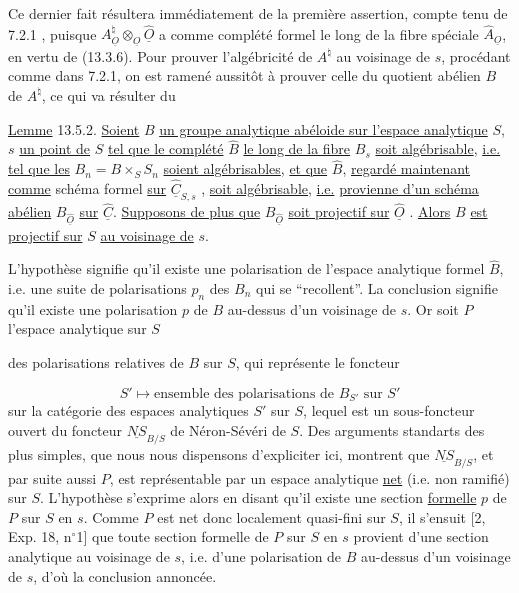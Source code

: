 Ce dernier fait résultera immédiatement de la première assertion, compte tenu de 7.2.1 , puisque $A^\natural_{\underline{O}} \otimes_{\underline{O}} \hat{\underline{O}}$ a comme complété formel le long de la fibre spéciale $\hat{A}_{\underline{O}}$, en vertu de (13.3.6). Pour prouver l'algébricité de $A^\natural$ au voisinage de $s$, procédant comme dans 7.2.1, on est ramené aussitôt à prouver celle du quotient abélien $B$ de $A^\natural$, ce qui va résulter du

\underline{Lemme} 13.5.2. \underline{Soient} $B$ \underline{un groupe analytique abéloide sur l'espace analytique} $S$, $s$ \underline{un point de} $S$ \underline{tel que le complété} $\hat{B}$ \underline{le long de la fibre} $B_s$ \underline{soit algébrisable}, \underline{i.e.} \underline{tel que les} $B_n = B \times_S S_n$ \underline{soient algébrisables}, \underline{et que} $\hat{B}$, \underline{regardé maintenant comme} schéma formel \underline{sur} $\hat{\underline{C}}_{S,s}$ , \underline{soit algébrisable}, \underline{i.e.} \underline{provienne d'un schéma abélien} $B_{\hat{\underline{O}}}$ \underline{sur} $\hat{\underline{C}}$. \underline{Supposons de plus que} $B_{\hat{\underline{O}}}$ \underline{soit projectif sur} $\hat{\underline{O}}$ . \underline{Alors} $B$ \underline{est projectif sur} $S$ \underline{au voisinage de} $s$.

L'hypothèse signifie qu'il existe une polarisation de l'espace analytique formel $\hat{B}$, i.e. une suite de polarisations $p_n$ des $B_n$ qui se ``recollent''. La conclusion signifie qu'il existe une polarisation $p$ de $B$ au-dessus d'un voisinage de $s$. Or soit $P$ l'espace analytique sur $S$



des polarisations relatives de $B$ sur $S$, qui représente le foncteur

\begin{equation*}
S' \longmapsto \text{ensemble des polarisations de } B_{S'} \text{ sur } S'
\end{equation*}
sur la catégorie des espaces analytiques $S'$ sur $S$, lequel est un sous-foncteur ouvert du foncteur $\underline{NS}_{B/S}$ de Néron-Sévéri de $S$. Des arguments standarts des plus simples, que nous nous dispensons d'expliciter ici, montrent que $\underline{NS}_{B/S}$, et par suite aussi $P$, est représentable par un espace analytique \underline{net} (i.e. non ramifié) sur $S$. L'hypothèse s'exprime alors en disant qu'il existe une section \underline{formelle} $p$ de $P$ sur $S$ en $s$. Comme $P$ est net donc localement quasi-fini sur $S$, il s'ensuit [2, Exp. 18, n$^{\circ}$1] que toute section formelle de $P$ sur $S$ en $s$ provient d'une section analytique au voisinage de $s$, i.e. d'une polarisation de $B$ au-dessus d'un voisinage de $s$, d'où la conclusion annoncée.

